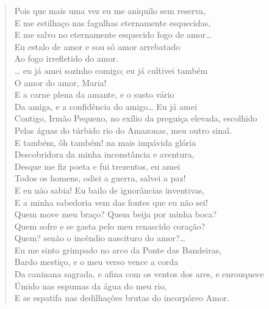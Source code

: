 {\begin{verse}
Pois que mais uma vez eu me aniquilo sem reserva,\\
E me estilhaço nas fagulhas eternamente esquecidas,\\
E me salvo no eternamente esquecido fogo de amor\ldots{}\\
Eu estalo de amor e sou só amor arrebatado\\
Ao fogo irrefletido do amor.\\
\ldots{} eu já amei sozinho comigo; eu já cultivei também\\
O amor do amor, Maria!\\
E a carne plena da amante, e o susto vário\\
Da amiga, e a confidência do amigo\ldots{} Eu já amei\\
Contigo, Irmão Pequeno, no exílio da preguiça elevada, escolhido\\
Pelas águas do túrbido rio do Amazonas, meu outro sinal.\\
E também, ôh também! na mais impávida glória\\
Descobridora da minha inconstância e aventura,\\
Desque me fiz poeta e fui trezentos, eu amei\\
Todos os homens, odiei a guerra, salvei a paz!\\
E eu não sabia! Eu bailo de ignorâncias inventivas,\\
E a minha sabedoria vem das fontes que eu não sei!\\
Quem move meu braço? Quem beija por minha boca?\\
Quem sofre e se gasta pelo meu renascido coração?\\
Quem? senão o incêndio nascituro do amor?\ldots{}\\
Eu me sinto grimpado no arco da Ponte das Bandeiras,\\
Bardo mestiço, e o meu verso vence a corda\\
Da caninana sagrada, e afina com os ventos dos ares, e enrouquece\\
Úmido nas espumas da água do meu rio,\\
E se espatifa nas dedilhações brutas do incorpóreo Amor.


\end{verse}}
